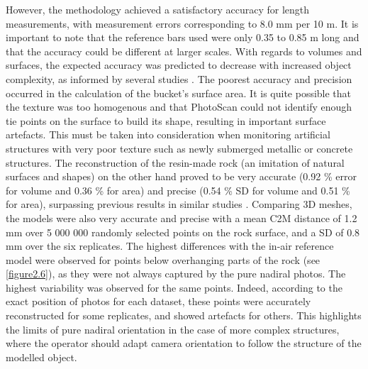 However, the methodology achieved a satisfactory accuracy for length measurements, with measurement errors corresponding to 8.0 mm per 10 m. It is important to note that the reference bars used were only 0.35 to 0.85 m long and that the accuracy could be different at larger scales. With regards to volumes and surfaces, the expected accuracy was predicted to decrease with increased object complexity, as informed by several studies \citep{figueira_accuracy_2015, bryson_characterization_2017}. The poorest accuracy and precision occurred in the calculation of the bucket’s surface area. It is quite possible that the texture was too homogenous and that PhotoScan could not identify enough tie points on the surface to build its shape, resulting in important surface artefacts. This must be taken into consideration when monitoring artificial structures with very poor texture such as newly submerged metallic or concrete structures. The reconstruction of the resin-made rock (an imitation of natural surfaces and shapes) on the other hand proved to be very accurate (0.92 \% error for volume and 0.36 \% for area) and precise (0.54 \% SD for volume and 0.51 \% for area), surpassing previous results in similar studies \citep{figueira_accuracy_2015, bythell_three-dimensional_2001, courtney_estimating_2007, gutierrez-heredia_end_2016, lavy_quick_2015, shortis_calibration_2015}. Comparing 3D meshes, the models were also very accurate and precise with a mean C2M distance of 1.2 mm over 5 000 000 randomly selected points on the rock surface, and a SD of 0.8 mm over the six replicates. The highest differences with the in-air reference model were observed for points below overhanging parts of the rock (see \autoref{figure2.6}), as they were not always captured by the pure nadiral photos. The highest variability was observed for the same points. Indeed, according to the exact position of photos for each dataset, these points were accurately reconstructed for some replicates, and showed artefacts for others. This highlights the limits of pure nadiral orientation in the case of more complex structures, where the operator should adapt camera orientation to follow the structure of the modelled object.

